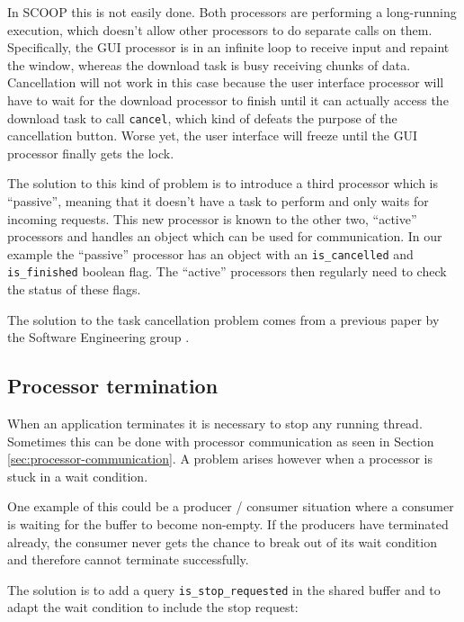 \documentclass[a4paper,10pt,titlepage]{article}
\begin{document}
In SCOOP this is not easily done.
Both processors are performing a long-running execution, which doesn't allow other processors to do separate calls on them.
Specifically, the GUI processor is in an infinite loop to receive input and repaint the window, whereas the download task is busy receiving chunks of data.
Cancellation will not work in this case because the user interface processor will have to wait for the download processor to finish until it can actually access the download task to call \lstinline!cancel!, 
which kind of defeats the purpose of the cancellation button.
Worse yet, the user interface will freeze until the GUI processor finally gets the lock.

The solution to this kind of problem is to introduce a third processor which is ``passive'', meaning that it doesn't have a task to perform and only waits for incoming requests.
This new processor is known to the other two, ``active'' processors and handles an object which can be used for communication.
In our example the ``passive'' processor has an object with an \lstinline!is_cancelled! and \lstinline!is_finished! boolean flag.
The ``active'' processors then regularly need to check the status of these flags.

The solution to the task cancellation problem comes from a previous paper by the Software Engineering group \cite{paper:task-cancellation}.

\subsection{Processor termination}
\label{sec:processor-termination}

When an application terminates it is necessary to stop any running thread.
Sometimes this can be done with processor communication as seen in Section \ref{sec:processor-communication}.
A problem arises however when a processor is stuck in a wait condition.

One example of this could be a producer / consumer situation where a consumer is waiting for the buffer to become non-empty.
If the producers have terminated already, the consumer never gets the chance to break out of its wait condition and therefore cannot terminate successfully.

The solution is to add a query \lstinline!is_stop_requested! in the shared buffer and to adapt the wait condition to include the stop request:
\end{document}
